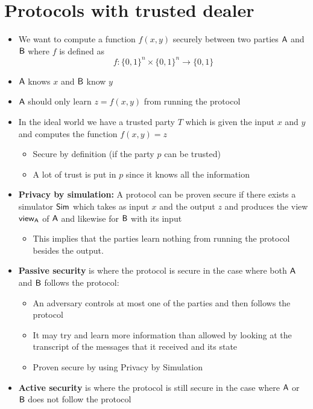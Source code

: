 \section{Protocols with trusted dealer}
\begin{itemize}
    \item We want to compute a function $f(x,y)$ securely between two parties $\mathsf{A}$ and $\mathsf{B}$ where $f$ is defined as 
    \begin{equation*}
        f : \{0,1\}^n \times \{0,1\}^n \to \{0,1\}
    \end{equation*}
    \item $\mathsf{A}$ knows $x$ and $\mathsf{B}$ know $y$
    \item $\mathsf{A}$ should only learn $z = f(x,y)$ from running the protocol
    \item In the ideal world we have a trusted party $T$ which is given the input $x$ and $y$ and computes the function $f(x,y) = z$ 
    \begin{itemize}
        \item Secure by definition (if the party $p$ can be trusted)
        \item A lot of trust is put in $p$ since it knows all the information
    \end{itemize}
    \item \textbf{Privacy by simulation:} A protocol can be proven secure if there exists a simulator $\mathsf{Sim}$ which takes as input $x$ and the output $z$ and produces the view $\mathsf{view}_{\mathsf{A}}$ of $\mathsf{A}$ and likewise for $\mathsf{B}$ with its input
        \begin{itemize}
            \item This implies that the parties learn nothing from running the protocol besides the output.
        \end{itemize}
    \item \textbf{Passive security} is where the protocol is secure in the case where both $\mathsf{A}$ and $\mathsf{B}$ follows the protocol:
    \begin{itemize}
        \item An adversary controls at most one of the parties and then follows the protocol 
        \item It may try and learn more information than allowed by looking at the transcript of the messages that it received and its state
        \item Proven secure by using Privacy by Simulation
    \end{itemize}
    \item \textbf{Active security} is where the protocol is still secure in the case where $\mathsf{A}$ or $\mathsf{B}$ does not follow the protocol

\end{itemize}
